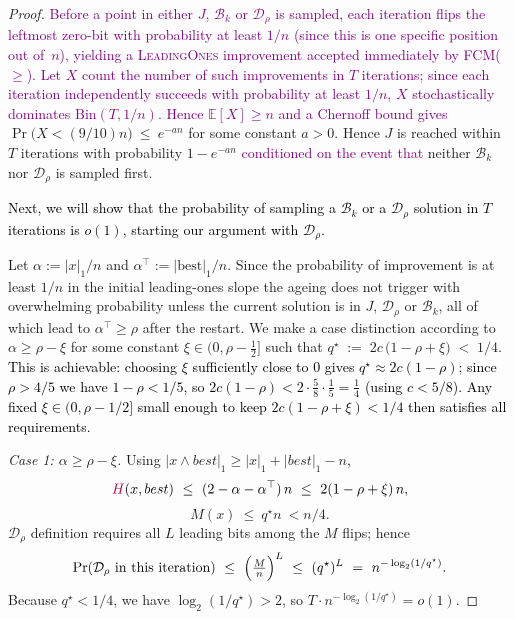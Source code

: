 \documentclass[lettersize,journal]{IEEEtran}
\newcommand{\rerev}[1]{\textcolor{purple}{#1}}
\newcommand{\EE}{\mathbb{E}}
\begin{document}
{\begin{proof}
	\rerev{Before a point in either $J$, $\mathcal{B}_k$ or $\mathcal{D}_\rho$ is sampled, each iteration flips the leftmost zero-bit with probability at least $1/n$ (since this is one specific position out of~$n$), yielding a \textsc{LeadingOnes} improvement accepted immediately by FCM($\ge$).  Let $X$ count the number of such improvements in $T$ iterations; since each iteration independently succeeds with probability at least $1/n$, $X$ stochastically dominates $\mathrm{Bin}(T,1/n)$.  Hence $\EE[X]\ge n$ and a Chernoff bound gives}
	$
	\Pr\bigl(X<(9/10)n\bigr)\ \le\ e^{-a n}
	$
	for some constant $a>0$. Hence $J$ is reached within $T$ iterations with probability $1-e^{-a n}$ \rerev{conditioned on the event that} neither $\mathcal{B}_k$ nor $\mathcal{D}_\rho$ is sampled first.
	
	\textcolor{black}{
		Next, we will show that the probability of sampling a $\mathcal{B}_k$ or a $\mathcal{D}_\rho$ solution in $T$ iterations is $o(1)$, starting our argument with $\mathcal{D}_\rho$. 
		}
	
	Let $\alpha:=|x|_1/n$ and $\alpha^\top:=|\text{best}|_1/n$. Since the probability of improvement is at least $1/n$ in the initial leading-ones slope the ageing does not trigger with overwhelming probability unless the current solution is in $J$, $\mathcal{D}_\rho$ or $\mathcal{B}_k$, all of which lead to $\alpha^\top\ge\rho$ after the restart. We make a case distinction according to $\alpha\ge \rho-\xi$ for some constant $\xi\in(0,\rho-\tfrac12]$  such that	$q^\star \;:=\; 2c\,\bigl(1-\rho+\xi\bigr) \;<\; 1/4$.
\textcolor{black}{This is achievable: choosing $\xi$ sufficiently close to $0$ gives
$q^\star \approx 2c(1-\rho)$; since $\rho > 4/5$ we have $1-\rho < 1/5$,
so $2c(1-\rho) < 2 \cdot \tfrac{5}{8} \cdot \tfrac{1}{5} = \tfrac{1}{4}$
(using $c < 5/8$).  Any fixed $\xi \in (0, \rho - 1/2]$ small enough to
keep $2c(1-\rho+\xi) < 1/4$ then satisfies all requirements.}
	
	\emph{Case 1: $\alpha\ge \rho-\xi$.}
	Using $|x\wedge best|_1\ge |x|_1+|best|_1-n$,
	\[
	\rerev{H}(x,best)\ \le\ (2-\alpha-\alpha^\top)\,n\ \le\ 2(1-\rho+\xi)\,n,
	\]
	\[
	M(x)\ \le\ q^\star n\ <n/4
	.
	\]
	$\mathcal{D}_\rho$ definition requires all $L$ leading bits among the $M$ flips; hence
	\[
	\Pr(\text{$\mathcal{D}_\rho$ in this iteration})
	\ \le\
	\Bigl(\tfrac{M}{n}\Bigr)^{L}
	\ \le\
	(q^\star)^{L}
	\ =\
	n^{-\log_{2}(1/q^\star)}.
	\]
	Because $q^\star<1/4$, we have $\log_{2}(1/q^\star)>2$, so $T\cdot n^{-\log_{2}(1/q^\star)}=o(1)$.
	

\end{proof}}
\end{document}
